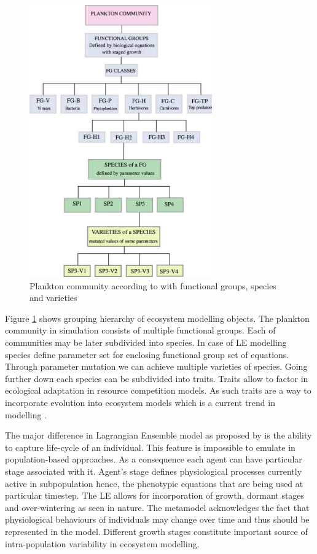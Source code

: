 \documentclass[12pt, a4paper]{report}
\begin{document}
\begin{figure}[H]
  \centering
  \includegraphics[width=0.7\textwidth,natwidth=744,natheight=1109]{images/fg.jpg}
  \caption{Plankton community according to \cite{Woods2005}
    with functional groups, species and varieties}
  \label{fig:fg}
\end{figure}

Figure \ref{fig:fg} shows grouping hierarchy of ecosystem modelling
objects. The plankton community in simulation consists of multiple functional
groups. Each of communities may be later subdivided into species. In case of
LE modelling species define parameter set for enclosing functional group set of
equations. Through parameter mutation we can achieve multiple varieties of
species. Going further down each species can be subdivided into traits.
Traits allow to factor in ecological adaptation in resource competition models.
As such traits are a way to incorporate evolution into ecosystem models
which is a current trend in modelling \cite{Clark20113823}.

The major difference in Lagrangian Ensemble model as proposed by
\cite{Woods2005} is the ability to capture life-cycle of an individual. This
feature is impossible to emulate in population-based approaches. As a
consequence each agent can have particular stage associated with it. Agent's
stage defines physiological processes currently active in subpopulation hence,
the phenotypic equations that are being used at particular timestep. The LE
allows for incorporation of growth, dormant stages and over-wintering as
seen in nature. The metamodel acknowledges the fact that physiological
behaviours of individuals may change over time and thus should be represented
in the model. Different growth stages constitute important source of intra-population
variability in ecosystem modelling.
\end{document}
